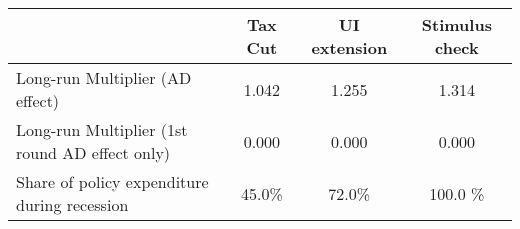 \begin{tabular}{@{}lccc@{}}
\toprule
& Tax Cut    & UI extension    & Stimulus check    \\  \midrule
Long-run Multiplier (AD effect) &1.042  & 1.255  & 1.314     \\
Long-run Multiplier (1st round AD effect only) &0.000  & 0.000  & 0.000     \\
Share of policy expenditure during recession &45.0\%  & 72.0\%  & 100.0 \%    \\
\end{tabular}
